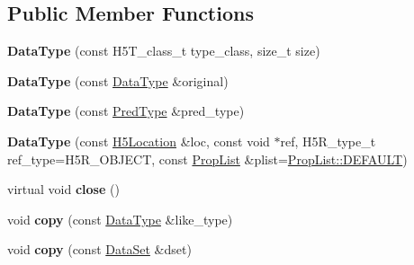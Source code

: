 \subsection*{Public Member Functions}
\begin{DoxyCompactItemize}
\item 
\mbox{\label{class_h5_1_1_data_type_a37dd5ff8f95b4016136b90c58c770f09}} 
{\bfseries Data\+Type} (const H5\+T\+\_\+class\+\_\+t type\+\_\+class, size\+\_\+t size)
\item 
\mbox{\label{class_h5_1_1_data_type_a4e72f20ab686efffeedd72d8afa99519}} 
{\bfseries Data\+Type} (const \hyperlink{class_h5_1_1_data_type}{Data\+Type} \&original)
\item 
\mbox{\label{class_h5_1_1_data_type_a5ee923eb1fc42063dcc9332aa2a71c8c}} 
{\bfseries Data\+Type} (const \hyperlink{class_h5_1_1_pred_type}{Pred\+Type} \&pred\+\_\+type)
\item 
\mbox{\label{class_h5_1_1_data_type_a56b100725299e1b64528ed4c987e9ecc}} 
{\bfseries Data\+Type} (const \hyperlink{class_h5_1_1_h5_location}{H5\+Location} \&loc, const void $\ast$ref, H5\+R\+\_\+type\+\_\+t ref\+\_\+type=H5\+R\+\_\+\+O\+B\+J\+E\+CT, const \hyperlink{class_h5_1_1_prop_list}{Prop\+List} \&plist=\hyperlink{class_h5_1_1_prop_list_ae52af66ce82af0ea7e6dc57148c56241}{Prop\+List\+::\+D\+E\+F\+A\+U\+LT})
\item 
\mbox{\label{class_h5_1_1_data_type_a5f413861386349cd99d3d92b45c0da44}} 
virtual void {\bfseries close} ()
\item 
\mbox{\label{class_h5_1_1_data_type_ad17cef439dbf1dd79458ba95612a9566}} 
void {\bfseries copy} (const \hyperlink{class_h5_1_1_data_type}{Data\+Type} \&like\+\_\+type)
\item 
\mbox{\label{class_h5_1_1_data_type_af8d75b01e62aa868424701add217b971}} 
void {\bfseries copy} (const \hyperlink{class_h5_1_1_data_set}{Data\+Set} \&dset)
\item 
\mbox{\label{class_h5_1_1_data_type_a202c1ebaae686dc92451bb842a149a60}} 

\end{DoxyCompactItemize}
